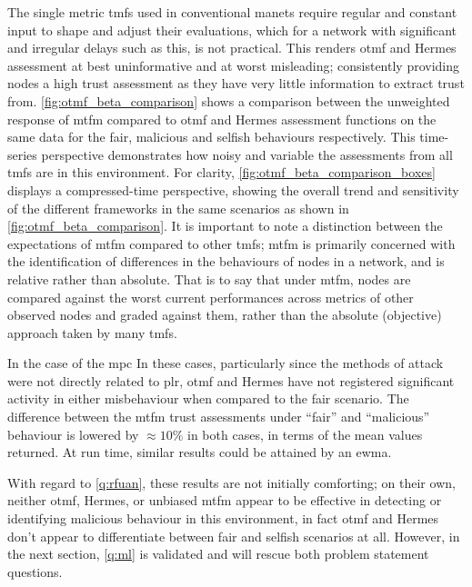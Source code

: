 The single metric \glspl{tmf} used in conventional \gls{manet}s require regular and constant input to shape and adjust their evaluations, which for a network with significant and irregular delays such as this, is not practical.
This renders \gls{otmf} and Hermes assessment at best uninformative and at worst misleading; consistently providing nodes a high trust assessment as they have very little information to extract trust from. 
\autoref{fig:otmf_beta_comparison} shows a comparison between the unweighted response of \gls{mtfm} compared to \gls{otmf} and Hermes assessment functions on the same data for the fair, malicious and selfish behaviours respectively.
This time-series perspective demonstrates how noisy and variable the assessments from all \glspl{tmf} are in this environment.
For clarity, \autoref{fig:otmf_beta_comparison_boxes} displays a compressed-time perspective, showing the overall trend and sensitivity of the different frameworks in the same scenarios as shown in \autoref{fig:otmf_beta_comparison}.
It is important to note a distinction between the expectations of \gls{mtfm} compared to other \glspl{tmf}; \gls{mtfm} is primarily concerned with the identification of differences in the behaviours of nodes in a network, and is relative rather than absolute.
That is to say that under \gls{mtfm}, nodes are compared against the worst current performances across metrics of other observed nodes and graded against them, rather than the absolute (objective) approach taken by many \glspl{tmf}.

In the case of the \gls{mpc}
In these cases, particularly since the methods of attack were not directly related to \gls{plr}, \gls{otmf} and Hermes have not registered significant activity in either misbehaviour when compared to the fair scenario.
The difference between the \gls{mtfm} trust assessments under ``fair'' and ``malicious'' behaviour is lowered by $\approx 10\%$ in both cases, in terms of the mean values returned.
At run time, similar results could be attained by an \gls{ewma}.

With regard to \autoref{q:rfuan}, these results are not initially comforting; on their own, neither \gls{otmf}, Hermes, or unbiased \gls{mtfm} appear to be effective in detecting or identifying malicious behaviour in this environment, in fact \gls{otmf} and Hermes don't appear to differentiate between fair and selfish scenarios at all. 
However, in the next section, \autoref{q:ml} is validated and will rescue both problem statement questions.



